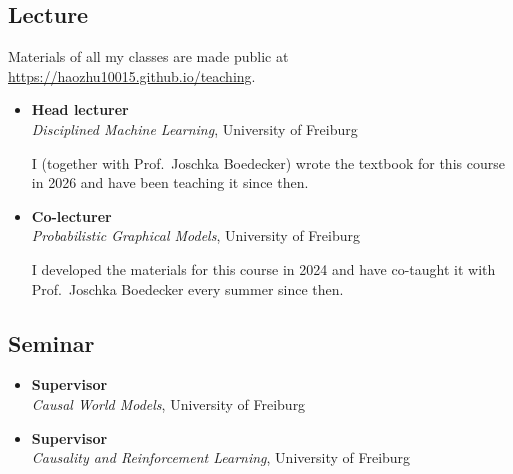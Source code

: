 \documentclass{article}
\newenvironment{cvblock}{%
    \begin{itemize}[
      leftmargin=1in,%
      labelsep=0.3in,%
      font=\itshape,%
      label={}%
    ]
}{%
    \end{itemize}
}
\begin{document}
\subsection*{Lecture}
Materials of all my classes are made public at \url{https://haozhu10015.github.io/teaching}.
\begin{cvblock}
    \item[2026--] \textbf{Head lecturer}\\
        \emph{Disciplined Machine Learning}, University of Freiburg\par
        I (together with Prof.~Joschka Boedecker) wrote the textbook for this course in 2026 and have been teaching it since then.
    \item[2024--] \textbf{Co-lecturer}\\
        \emph{Probabilistic Graphical Models}, University of Freiburg\par
        I developed the materials for this course in 2024 and have co-taught it with Prof.~Joschka Boedecker every summer since then.
\end{cvblock}
\subsection*{Seminar}
\begin{cvblock}
    \item[2026] \textbf{Supervisor}\\
        \emph{Causal World Models}, University of Freiburg
    \item[2024] \textbf{Supervisor}\\
        \emph{Causality and Reinforcement Learning}, University of Freiburg
\end{cvblock}
\end{document}
